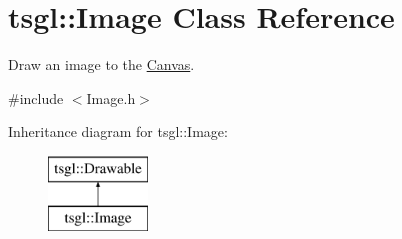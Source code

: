 \hypertarget{classtsgl_1_1_image}{}\section{tsgl\+:\+:Image Class Reference}
\label{classtsgl_1_1_image}


Draw an image to the \hyperlink{classtsgl_1_1_canvas}{Canvas}.  




{\ttfamily \#include $<$Image.\+h$>$}

Inheritance diagram for tsgl\+:\+:Image\+:\begin{figure}[H]
\begin{center}
\leavevmode
\includegraphics[height=2.000000cm]{classtsgl_1_1_image}
\end{center}
\end{figure}
